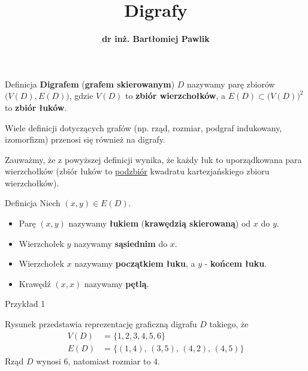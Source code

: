 \documentclass[a4paper,10pt]{beamer}
\title{\bf Digrafy}
\author[B. Pawlik]{\bf dr inż. Bartłomiej Pawlik}
\begin{document}
\begin{frame}
\titlepage
\end{frame}

\begin{frame}
	\begin{block}{Definicja}
		{\bf Digrafem} ({\bf grafem skierowanym}) $D$ nazywamy parę zbiorów $\big(V(D),E(D)\big)$, gdzie $V(D)$ to {\bf zbiór wierzchołków}, a $E(D)\subset \big(V(D)\big)^2$ to {\bf zbiór łuków}.
	\end{block}

	Wiele definicji dotyczących grafów (np. rząd, rozmiar, podgraf indukowany, izomorfizm) przenosi się również na digrafy.
	
	Zauważmy, że z powyższej definicji wynika, że każdy łuk to uporządkowana para wierzchołków (zbiór łuków to \underline{podzbiór} kwadratu kartezjańskiego zbioru wierzchołków).

\begin{block}{Definicja}
Niech $(x,y)\in E(D)$.
\begin{itemize}
\item	Parę $(x,y)$ nazywamy {\bf łukiem} ({\bf krawędzią skierowaną}) od $x$ do $y$.
\item Wierzchołek $y$ nazywamy {\bf sąsiednim} do $x$.
\item Wierzchołek $x$ nazywamy {\bf początkiem łuku}, a $y$ - {\bf końcem łuku}.
\item Krawędź $(x,x)$ nazywamy {\bf pętlą}.
\end{itemize}
\end{block}
\end{frame}



	
\begin{frame}
	
	\begin{exampleblock}{Przykład 1}
		\begin{minipage}{3.5cm}
		
		\end{minipage}
		\begin{minipage}{8cm}
			Rysunek przedstawia reprezentację graficzną digrafu $D$ takiego, że
			\begin{align*}
				V(D)&=\{1,2,3,4,5,6\}\\
				E(D)&=\{(1,4),\,(3,5),\,(4,2),\,(4,5)\}
			\end{align*}
		Rząd $D$ wynosi $6$, natomiast rozmiar to $4$.
		\end{minipage}
	\end{exampleblock}
	
\end{frame}
\end{document}
